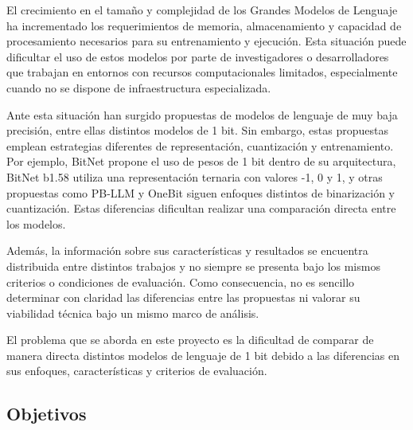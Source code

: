 
El crecimiento en el tamaño y complejidad de los Grandes Modelos de Lenguaje ha incrementado los requerimientos de memoria, almacenamiento y capacidad de procesamiento necesarios para su entrenamiento y ejecución. Esta situación puede dificultar el uso de estos modelos por parte de investigadores o desarrolladores que trabajan en entornos con recursos computacionales limitados, especialmente cuando no se dispone de infraestructura especializada.

Ante esta situación han surgido propuestas de modelos de lenguaje de muy baja precisión, entre ellas distintos modelos de 1 bit. Sin embargo, estas propuestas emplean estrategias diferentes de representación, cuantización y entrenamiento. Por ejemplo, BitNet propone el uso de pesos de 1 bit dentro de su arquitectura, BitNet b1.58 utiliza una representación ternaria con valores -1, 0 y 1, y otras propuestas como PB-LLM y OneBit siguen enfoques distintos de binarización y cuantización. Estas diferencias dificultan realizar una comparación directa entre los modelos.

Además, la información sobre sus características y resultados se encuentra distribuida entre distintos trabajos y no siempre se presenta bajo los mismos criterios o condiciones de evaluación. Como consecuencia, no es sencillo determinar con claridad las diferencias entre las propuestas ni valorar su viabilidad técnica bajo un mismo marco de análisis.

El problema que se aborda en este proyecto es la dificultad de comparar de manera directa distintos modelos de lenguaje de 1 bit debido a las diferencias en sus enfoques, características y criterios de evaluación.

\subsection{Objetivos} \label{sec:objetivos} %

